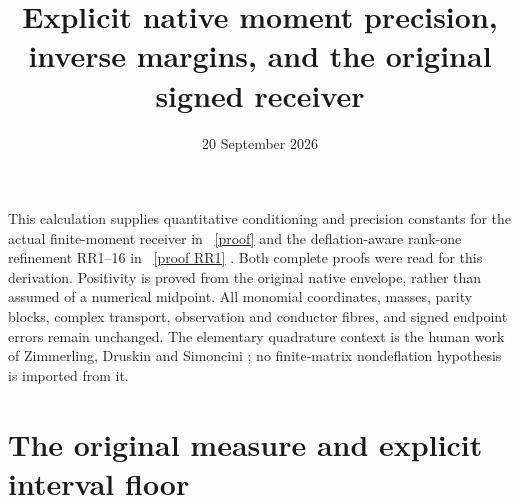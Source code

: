 \documentclass[11pt]{article}
\title{Explicit native moment precision, inverse margins, and the original signed receiver}
\author{}
\date{20 September 2026}
\begin{document}
\maketitle

This calculation supplies quantitative conditioning and precision
constants for the actual finite-moment receiver in \cite{FM}%
~\href{https://github.com/KokunoYumeto/zeta-function-research-reader/blob/5992ad50c0f2a06921f1fcaded7b4e38097c0739/workbenches/splitzero-tandem/continuations/20260920-original-kernel-mixed-determinants/providers/NATIVE_RESOLVENT_MOMENT_ENCLOSURES.tex\#L1}{[proof]}%
{} and the
deflation-aware rank-one refinement RR1--16 in \cite{RR}%
~\href{https://github.com/KokunoYumeto/zeta-function-research-reader/blob/5992ad50c0f2a06921f1fcaded7b4e38097c0739/workbenches/splitzero-tandem/continuations/20260920-original-kernel-mixed-determinants/providers/NATIVE_RESOLVENT_RANK_ONE.tex\#L50}{[proof RR1]}%
{}. Both complete
proofs were read for this derivation. Positivity is proved from the
original native envelope, rather than assumed of a numerical midpoint.
All monomial coordinates, masses, parity blocks, complex transport,
observation and conductor fibres, and signed endpoint errors remain
unchanged. The elementary quadrature context is the human work of
Zimmerling, Druskin and Simoncini \cite{ZDS}; no finite-matrix
nondeflation hypothesis is imported from it.

\section{The original measure and explicit interval floor}
\end{document}
